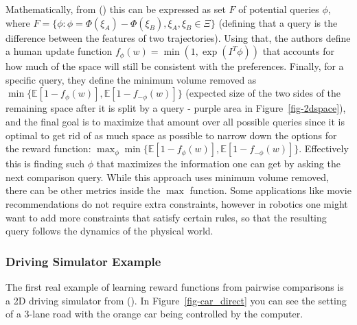 \documentclass[
  letterpaper,
  numbers=noenddot,
  DIV=11]{scrreprt}
\theoremstyle{definition}
\theoremstyle{plain}
\theoremstyle{plain}
\theoremstyle{remark}
\begin{document}
Mathematically, from () this can be expressed as set \(F\) of potential queries \(\phi\),
where
\(F = \{\phi: \phi = \Phi(\xi_A) - \Phi(\xi_B), \xi_A, \xi_B \in \Xi\}\)
(defining that a query is the difference between the features of two
trajectories). Using that, the authors define a human update function
\(f_{\phi}(w) = \min(1, \exp(I^T\phi))\) that accounts for how much of
the space will still be consistent with the preferences. Finally, for a
specific query, they define the minimum volume removed as
\(\min\{\mathbb{E}[1 - f_{\phi}(w)], \mathbb{E}[1 - f_{-\phi}(w)]\}\)
(expected size of the two sides of the remaining space after it is split
by a query - purple area in Figure~\ref{fig-2dspace}), and the final
goal is to maximize that amount over all possible queries since it is
optimal to get rid of as much space as possible to narrow down the
options for the reward function:
\(\max_{\phi} \min\{ \mathbb{E}[1 - f_{\phi}(w)], \mathbb{E}[1 - f_{-\phi}(w)]\}\).
Effectively this is finding such \(\phi\) that maximizes the information
one can get by asking the next comparison query. While this approach
uses minimum volume removed, there can be other metrics inside the
\(\max\) function. Some applications like movie recommendations do not
require extra constraints, however in robotics one might want to add
more constraints that satisfy certain rules, so that the resulting query
follows the dynamics of the physical world.

\subsubsection*{Driving Simulator
Example}\label{driving-simulator-example}

The first real example of learning reward functions from pairwise
comparisons is a 2D driving simulator from
(). In
Figure~\ref{fig-car_direct} you can see the setting of a 3-lane road
with the orange car being controlled by the computer.
\end{document}
